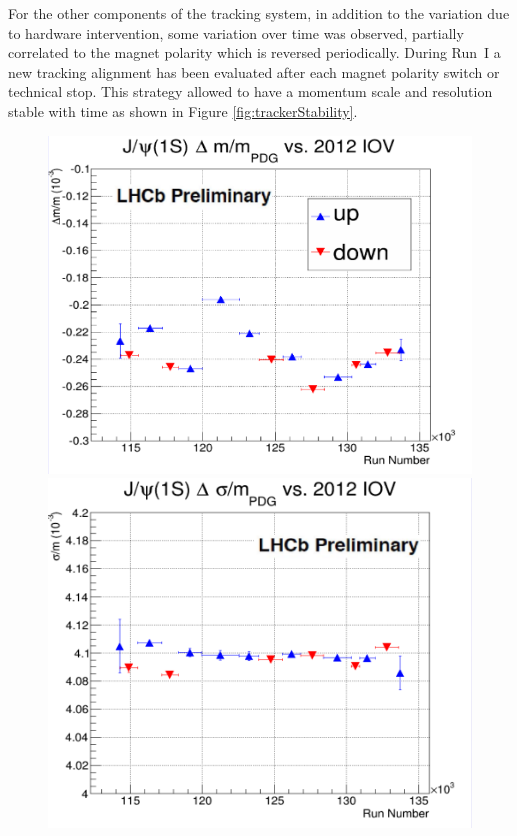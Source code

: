 For the other components of the tracking system, in addition to the variation
due to hardware intervention, some variation over time was observed, partially
correlated to the magnet polarity which is reversed periodically. During Run~I a
new tracking alignment has been evaluated after each magnet polarity switch or
technical stop.  This strategy allowed to have a momentum scale and resolution
stable with time as shown in Figure \ref{fig:trackerStability}.

\begin{figure}[h]
\begin{minipage}{0.5\columnwidth}
\includegraphics[width=\columnwidth]{../figures/JPsi1.png}
\end{minipage}\hspace{2pc}%
\begin{minipage}{0.5\columnwidth}
\includegraphics[width=\columnwidth]{../figures/JPsi2.png}

\end{minipage}
\end{figure}
